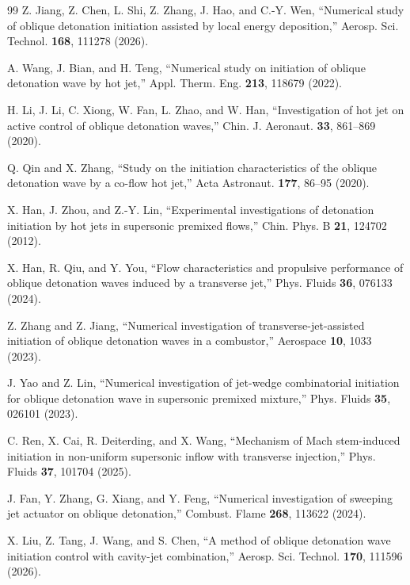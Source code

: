 \documentclass[aip,pof,preprint,amsmath,amssymb]{revtex4-2}
\begin{document}
\begin{thebibliography}{99}
 Z. Jiang, Z. Chen, L. Shi, Z. Zhang, J. Hao, and C.-Y. Wen, ``Numerical study of oblique detonation initiation assisted by local energy deposition,'' Aerosp. Sci. Technol. \textbf{168}, 111278 (2026).

 A. Wang, J. Bian, and H. Teng, ``Numerical study on initiation of oblique detonation wave by hot jet,'' Appl. Therm. Eng. \textbf{213}, 118679 (2022).

 H. Li, J. Li, C. Xiong, W. Fan, L. Zhao, and W. Han, ``Investigation of hot jet on active control of oblique detonation waves,'' Chin. J. Aeronaut. \textbf{33}, 861--869 (2020).

 Q. Qin and X. Zhang, ``Study on the initiation characteristics of the oblique detonation wave by a co-flow hot jet,'' Acta Astronaut. \textbf{177}, 86--95 (2020).

 X. Han, J. Zhou, and Z.-Y. Lin, ``Experimental investigations of detonation initiation by hot jets in supersonic premixed flows,'' Chin. Phys. B \textbf{21}, 124702 (2012).

 X. Han, R. Qiu, and Y. You, ``Flow characteristics and propulsive performance of oblique detonation waves induced by a transverse jet,'' Phys. Fluids \textbf{36}, 076133 (2024).

 Z. Zhang and Z. Jiang, ``Numerical investigation of transverse-jet-assisted initiation of oblique detonation waves in a combustor,'' Aerospace \textbf{10}, 1033 (2023).

 J. Yao and Z. Lin, ``Numerical investigation of jet-wedge combinatorial initiation for oblique detonation wave in supersonic premixed mixture,'' Phys. Fluids \textbf{35}, 026101 (2023).

 C. Ren, X. Cai, R. Deiterding, and X. Wang, ``Mechanism of Mach stem-induced initiation in non-uniform supersonic inflow with transverse injection,'' Phys. Fluids \textbf{37}, 101704 (2025).

 J. Fan, Y. Zhang, G. Xiang, and Y. Feng, ``Numerical investigation of sweeping jet actuator on oblique detonation,'' Combust. Flame \textbf{268}, 113622 (2024).

 X. Liu, Z. Tang, J. Wang, and S. Chen, ``A method of oblique detonation wave initiation control with cavity-jet combination,'' Aerosp. Sci. Technol. \textbf{170}, 111596 (2026).


\end{thebibliography}
\end{document}
